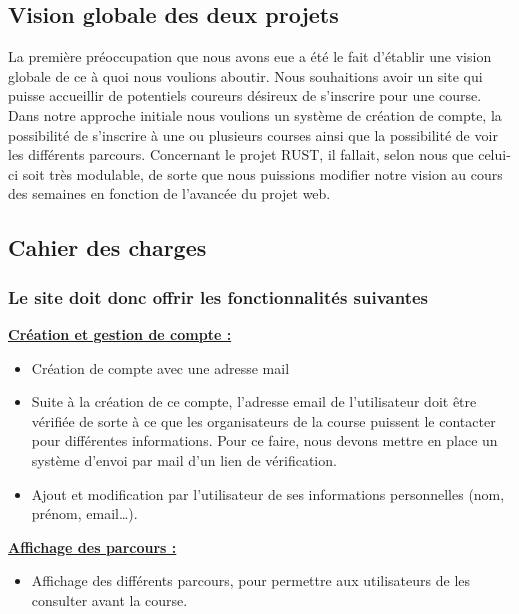 \documentclass[12pt]{article} %
\begin{document}
	\subsection{Vision globale des deux projets}
		La première préoccupation que nous avons eue a été le fait d’établir une vision globale de ce à quoi nous voulions aboutir. Nous souhaitions avoir un site qui puisse accueillir de potentiels coureurs désireux de s’inscrire pour une course. Dans notre approche initiale nous voulions un système de création de compte, la possibilité de s’inscrire à une ou plusieurs courses ainsi que la possibilité de voir les différents parcours.
	Concernant le projet RUST, il fallait, selon nous que celui-ci soit très modulable, de sorte que nous puissions modifier notre vision au cours des semaines en fonction de l’avancée du projet web. 


	
	\subsection{Cahier des charges}
		\subsubsection{Le site doit donc offrir les fonctionnalités suivantes}
\textbf{\underline{Création et gestion de compte :}}
		\begin{itemize}
			\item Création de compte avec une adresse mail
			\item Suite à la création de ce compte, l’adresse email de l’utilisateur doit être vérifiée de sorte à ce que les organisateurs de la course puissent le contacter pour différentes informations. Pour ce faire, nous devons mettre en place un système d’envoi par mail d’un lien de vérification.
			\item Ajout et modification par l’utilisateur de ses informations personnelles (nom, prénom, email…).
		\end{itemize}
	
\textbf{\underline{Affichage des parcours : }}
		\begin{itemize}
			\item Affichage des différents parcours, pour permettre aux utilisateurs de les consulter avant la course.
		\end{itemize}
		
\end{document}
